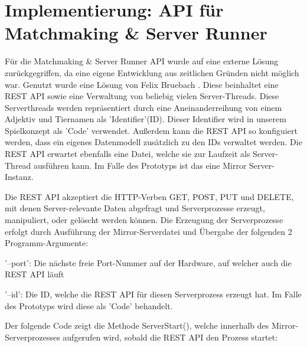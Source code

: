 \section{Implementierung: API für Matchmaking \& Server Runner}

Für die Matchmaking \& Server Runner API wurde auf eine externe Lösung zurückgegriffen, da eine eigene Entwicklung aus zeitlichen Gründen nicht möglich war. Genutzt wurde eine Lösung von Felix Bruebach \cite{GitHub.20.02.2022}. Diese beinhaltet eine REST API sowie eine Verwaltung von beliebig vielen Server-Threads. Diese Serverthreads werden repräsentiert durch eine Aneinanderreihung von einem Adjektiv und Tiernamen als 'Identifier'(ID). Dieser Identifier wird in unserem Spielkonzept als 'Code' verwendet. Außerdem kann die REST API so konfiguiert werden, dass ein eigenes Datenmodell zusätzlich zu den IDs verwaltet werden. Die REST API erwartet ebenfalls eine Datei, welche sie zur Laufzeit als Server-Thread ausführen kann. Im Falle des Prototyps ist das eine Mirror Server-Instanz.

Die REST API akzeptiert die HTTP-Verben GET, POST, PUT und DELETE, mit denen Server-relevante Daten abgefragt und Serverprozesse erzeugt, manipuliert, oder gelöscht werden können. Die Erzeugung der Serverprozesse erfolgt durch Ausführung der Mirror-Serverdatei und Übergabe der folgenden 2 Programm-Argumente:

'--port': Die nächste freie Port-Nummer auf der Hardware, auf welcher auch die REST API läuft

'--id': Die ID, welche die REST API für diesen Serverprozess erzeugt hat. Im Falle des Prototyps wird diese als 'Code' behandelt.

Der folgende Code zeigt die Methode ServerStart(), welche innerhalb des Mirror-Serverprozesses aufgerufen wird, sobald die REST API den Prozess startet:

